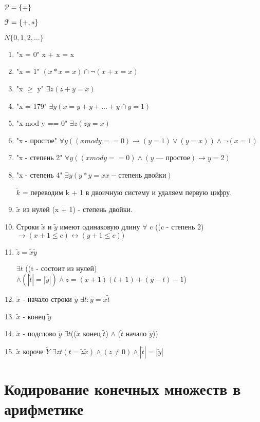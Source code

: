 \documentclass[12pt]{article}
\begin{document}
$\EuScript P = \{=\}$


$\EuScript F = \{+, *\}$


$N  \{0, 1, 2, \ldots\}$

\begin{enumerate}

\item "x = 0" x + x = x
\item "x = 1" $(x * x = x) \cap \neg(x + x = x)$
\item "x $\ge$ y" $\exists z (z + y = x)$
\item "x = 179" $\exists y (x = y + y + \ldots + y \cap y = 1)$
\item "x mod y == 0" $\exists z (zy = x)$
\item "x - простое" $\forall y((x mod y == 0) \to (y = 1) \vee (y = x)) \wedge \neg(x = 1)$
\item "x - степень 2" $\forall y((x mod y == 0) \wedge (y \text{~--- простое}) \to y = 2)$
\item "x - степень 4" $\exists y(y * y = x x - \text{степень двойки})$

$\tilde k$ = переводим k + 1 в двоичную систему и удаляем первую цифру. 

\item $\tilde x$ из нулей (x + 1) - степень двойки.
\item Строки $\tilde x$ и $\tilde y$ имеют одинаковую длину $\forall$ c ((c - степень 2) $\to (x+ 1 \le c) \leftrightarrow (y + 1 \le c))$
\item $\tilde z = \tilde x \tilde y$

$\exists t$ ((t - состоит из нулей) $\wedge (|\tilde t| = |\tilde y|) \wedge z = (x + 1)(t + 1) + (y - t) - 1$)

\item $\tilde x$ - начало строки $\tilde y$ $\exists t:\tilde y = \tilde x \tilde t$
\item $\tilde x$ - конец $\tilde y$
\item $\tilde x$ - подслово $\tilde y$ $\exists t$(($\tilde x$ конец $\tilde t$) $\wedge$ ($\tilde t$ начало $\tilde y$))
\item $\tilde x$ короче $\tilde Y$ $\exists zt (t = \tilde z \tilde x) \wedge (z \ne 0) \wedge |\tilde t| = |\tilde y|$

\end{enumerate}

\section{Кодирование конечных множеств в арифметике} 
\end{document}
